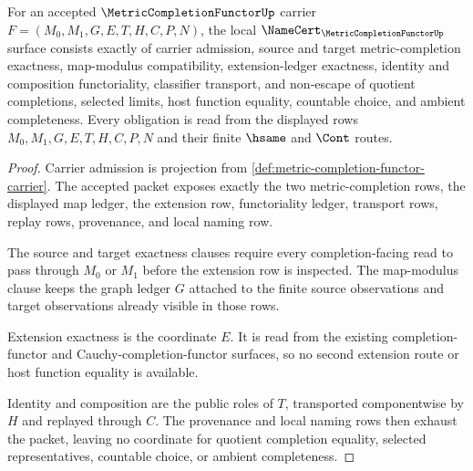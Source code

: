 \begin{theorem}
\label{thm:metric-completion-functor-namecert-obligations}
For an accepted $\MetricCompletionFunctorUp$ carrier $F=(M_0,M_1,G,E,T,H,C,P,N)$, the local $\NameCert_{\MetricCompletionFunctorUp}$ surface consists exactly of carrier admission, source and target metric-completion exactness, map-modulus compatibility, extension-ledger exactness, identity and composition functoriality, classifier transport, and non-escape of quotient completions, selected limits, host function equality, countable choice, and ambient completeness. Every obligation is read from the displayed rows $M_0,M_1,G,E,T,H,C,P,N$ and their finite $\hsame$ and $\Cont$ routes.
\end{theorem}
\begin{proof}
Carrier admission is projection from \autoref{def:metric-completion-functor-carrier}. The accepted packet exposes exactly the two metric-completion rows, the displayed map ledger, the extension row, functoriality ledger, transport rows, replay rows, provenance, and local naming row.

The source and target exactness clauses require every completion-facing read to pass through $M_0$ or $M_1$ before the extension row is inspected. The map-modulus clause keeps the graph ledger $G$ attached to the finite source observations and target observations already visible in those rows.

Extension exactness is the coordinate $E$. It is read from the existing completion-functor and Cauchy-completion-functor surfaces, so no second extension route or host function equality is available.

Identity and composition are the public roles of $T$, transported componentwise by $H$ and replayed through $C$. The provenance and local naming rows then exhaust the packet, leaving no coordinate for quotient completion equality, selected representatives, countable choice, or ambient completeness.
\end{proof}

